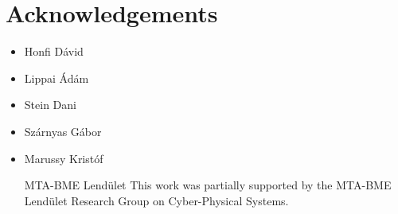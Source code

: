 \chapter*{Acknowledgements}
{}
\thispagestyle{plain}

\begin{itemize}

\item
Honfi Dávid
\item
Lippai Ádám
\item
Stein Dani
\item
Szárnyas Gábor
\item
Marussy Kristóf


MTA-BME Lendület This work was partially supported by the MTA-BME Lendület Research Group on Cyber-Physical Systems.



\end{itemize}


